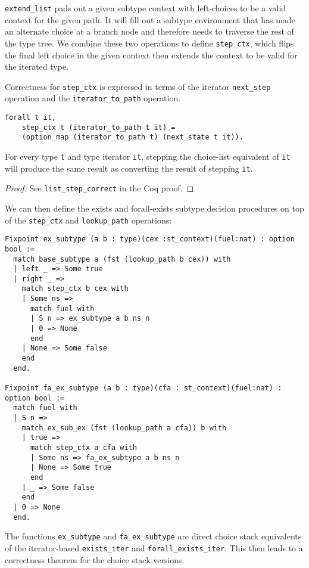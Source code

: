 \documentclass[a4paper,UKenglish]{lipics-v2018}
\begin{document}
\verb|extend_list| pads out a given subtype context with left-choices to be a
valid context for the given path. It will fill out a subtype environment that
has made an alternate choice at a branch node and therefore needs to traverse
the rest of the type tree. We combine these two operations to define
\verb|step_ctx|, which flips the final left choice in the given context then
extends the context to be valid for the iterated type.

Correctness for \verb|step_ctx| is expressed in terms of the iterator
\verb|next_step| operation and the \verb|iterator_to_path| operation.

\begin{lemma}
\begin{verbatim}
forall t it,
    step_ctx t (iterator_to_path t it) =
    (option_map (iterator_to_path t) (next_state t it)).
\end{verbatim}
For every type \verb|t| and type iterator \verb|it|,
stepping the choice-list equivalent of \verb|it| will
produce the same result as converting the result of stepping
\verb|it|.
\end{lemma}
\begin{proof}
See \verb|list_step_correct| in the Coq proof.
\end{proof}

We can then define the exists and forall-exists subtype decision procedures
on top of the \verb|step_ctx| and \verb|lookup_path| operations:

\begin{verbatim}
Fixpoint ex_subtype (a b : type)(cex :st_context)(fuel:nat) : option bool :=
  match base_subtype a (fst (lookup_path b cex)) with
  | left _ => Some true
  | right _ =>
    match step_ctx b cex with
    | Some ns =>
      match fuel with
      | S n => ex_subtype a b ns n
      | 0 => None
      end
    | None => Some false
    end
  end.

Fixpoint fa_ex_subtype (a b : type)(cfa : st_context)(fuel:nat) : option bool :=
  match fuel with
  | S n =>
    match ex_sub_ex (fst (lookup_path a cfa)) b with
    | true =>
      match step_ctx a cfa with
      | Some ns => fa_ex_subtype a b ns n
      | None => Some true
      end
    | _ => Some false
    end
  | 0 => None
  end.
\end{verbatim}

The functions \verb|ex_subtype| and \verb|fa_ex_subtype| are direct choice stack equivalents
of the iterator-based \verb|exists_iter| and \verb|forall_exists_iter|. This then leads to
a correctness theorem for the choice stack versions.
\end{document}
